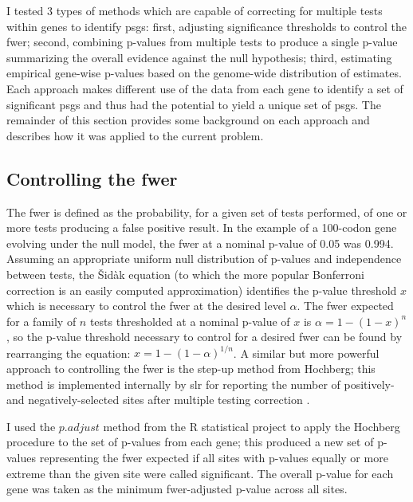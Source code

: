 I tested 3 types of methods which are capable of correcting for
multiple \sw tests within genes to identify \acp{psg}: first,
adjusting significance thresholds to control the \ac{fwer}; second,
combining p-values from multiple tests to produce a single p-value
summarizing the overall evidence against the null hypothesis; third,
estimating empirical gene-wise p-values based on the genome-wide
distribution of \sw estimates. Each approach makes different use of
the \sw data from each gene to identify a set of significant \acp{psg}
and thus had the potential to yield a unique set of \acp{psg}. The
remainder of this section provides some background on each approach
and describes how it was applied to the current problem.

\subsection{Controlling the \ac{fwer}}

The \ac{fwer} is defined as the probability, for a given set of tests
performed, of one or more tests producing a false positive result. In
the example of a 100-codon gene evolving under the null model, the
\ac{fwer} at a nominal p-value of 0.05 was 0.994. Assuming an
appropriate uniform null distribution of p-values and independence
between tests, the \v{S}id\`{a}k equation (to which the more popular
Bonferroni correction is an easily computed approximation) identifies
the p-value threshold $x$ which is necessary to control the \ac{fwer}
at the desired level $\alpha$. The \ac{fwer} expected for a family of
$n$ tests thresholded at a nominal p-value of $x$ is $\alpha=1 - (1 -
x)^{n}$, so the p-value threshold necessary to control for a desired
\ac{fwer} can be found by rearranging the equation: $x=1 - (1 -
\alpha)^{1/n}$. A similar but more powerful approach to controlling
the \ac{fwer} is the step-up method from Hochberg; this method is
implemented internally by \ac{slr} for reporting the number of
positively- and negatively-selected sites after multiple testing
correction \citep{Hochberg1988,Massingham2005}.

I used the $p.adjust$ method from the R statistical project to apply
the Hochberg procedure to the set of \sw p-values from each gene; this
produced a new set of p-values representing the \ac{fwer} expected if
all sites with p-values equally or more extreme than the given site
were called significant. The overall p-value for each gene was taken
as the minimum \ac{fwer}-adjusted p-value across all sites.

